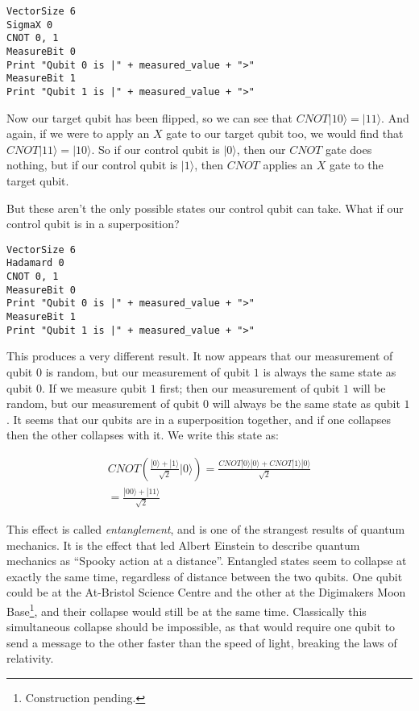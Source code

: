 \documentclass[twocolumn]{article}
\begin{document}
\begin{lstlisting}
VectorSize 6
SigmaX 0
CNOT 0, 1
MeasureBit 0
Print "Qubit 0 is |" + measured_value + ">"
MeasureBit 1
Print "Qubit 1 is |" + measured_value + ">"
\end{lstlisting}

Now our target qubit has been flipped, so we can see that $CNOT|10\rangle = |11\rangle$. And again, if we were to apply an $X$ gate to our target qubit too, we would find that $CNOT|11\rangle = |10\rangle$. So if our control qubit is $|0\rangle$, then our $CNOT$ gate does nothing, but if our control qubit is $|1\rangle$, then $CNOT$ applies an $X$ gate to the target qubit.

But these aren't the only possible states our control qubit can take. What if our control qubit is in a superposition?

\begin{lstlisting}
VectorSize 6
Hadamard 0
CNOT 0, 1
MeasureBit 0
Print "Qubit 0 is |" + measured_value + ">"
MeasureBit 1
Print "Qubit 1 is |" + measured_value + ">"
\end{lstlisting}

This produces a very different result. It now appears that our measurement of qubit $0$ is random, but our measurement of qubit $1$ is always the same state as qubit $0$. If we measure qubit $1$ first; then our measurement of qubit $1$ will be random, but our measurement of qubit $0$ will always be the same state as qubit $1$. It seems that our qubits are in a superposition together, and if one collapses then the other collapses with it. We write this state as:

\begin{gather*}
CNOT\left(\frac{|0\rangle + |1\rangle}{\sqrt{2}}|0\rangle\right) = \frac{CNOT|0\rangle|0\rangle + CNOT|1\rangle|0\rangle}{\sqrt{2}}\\
= \frac{|00\rangle + |11\rangle}{\sqrt{2}}
\end{gather*}

This effect is called {\em entanglement}, and is one of the strangest results of quantum mechanics. It is the effect that led Albert Einstein to describe quantum mechanics as ``Spooky action at a distance''. Entangled states seem to collapse at exactly the same time, regardless of distance between the two qubits. One qubit could be at the At-Bristol Science Centre and the other at the Digimakers Moon Base\footnote{Construction pending.}, and their collapse would still be at the same time. Classically this simultaneous collapse should be impossible, as that would require one qubit to send a message to the other faster than the speed of light, breaking the laws of relativity.
\end{document}
